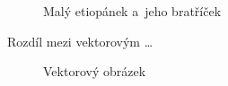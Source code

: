 \documentclass[11pt,a4paper,oneside]{article}
\begin{document}
\begin{figure}[H]
{		 }
		\caption{Malý etiopánek a~jeho bratříček}
 		\label{fig:pic1}
	\end{figure}
	
	Rozdíl mezi vektorovým \dots	
	
	\begin{figure}[H]
  		\centering
		\caption{Vektorový obrázek}
 		\label{fig:pic2}
	\end{figure}
	
\end{document}
